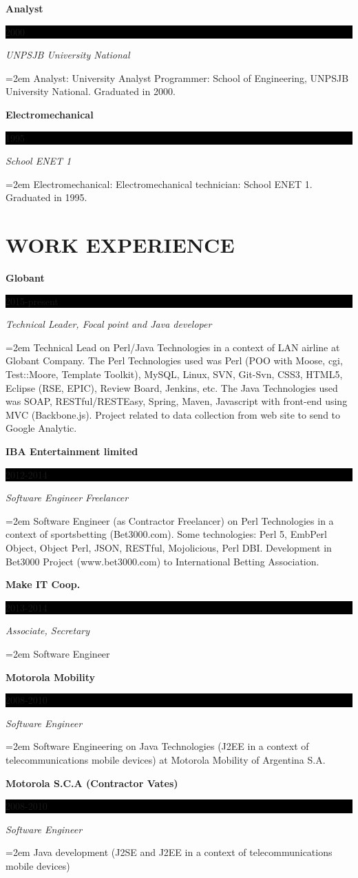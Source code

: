 \documentclass[paper=a4,fontsize=11pt]{scrartcl} %
\newcommand{\sepspace}{\vspace*{1em}}		%
\newcommand{\NewPart}[1]{\section*{\uppercase{#1}}}
\newcommand{\EducationEntry}[4]{
		\noindent \textbf{#1} \hfill      %
		\colorbox{Black}{%
			\parbox{6em}{%
			\hfill\color{White}#2}} \par  %
		\noindent \textit{#3} \par        %
		\noindent\hangindent=2em\hangafter=0 \small #4 %
		\normalsize \par}
\begin{document}
\EducationEntry{Analyst}{2000}{UNPSJB University National}{Analyst: University Analyst Programmer: School of Engineering, UNPSJB University National. Graduated in 2000.}
\sepspace

\EducationEntry{Electromechanical}{1995}{School ENET 1}{Electromechanical: Electromechanical technician: School ENET 1. Graduated in 1995.}
\sepspace

\NewPart{Work experience}{}

\EducationEntry{Globant}{2015-present}{Technical Leader, Focal point and Java developer}
{Technical Lead on Perl/Java Technologies in a context of LAN airline at Globant Company. The Perl Technologies used was Perl (POO with Moose, cgi, Test::Moore, Template Toolkit), MySQL, Linux, SVN, Git-Svn, CSS3, HTML5, Eclipse (RSE, EPIC), Review Board, Jenkins, etc. The Java Technologies used was SOAP, RESTful/RESTEasy, Spring, Maven, Javascript with front-end using MVC (Backbone.js). Project related to data collection from web site to send to Google Analytic.}
\sepspace

\EducationEntry{IBA Entertainment limited}{2012-2014}{Software Engineer Freelancer}
{Software Engineer (as Contractor Freelancer) on Perl Technologies in a context of sportsbetting (Bet3000.com). Some technologies: Perl 5, EmbPerl Object, Object Perl, JSON, RESTful, Mojolicious, Perl DBI. Development in Bet3000 Project (www.bet3000.com) to International Betting Association.}
\sepspace

\EducationEntry{Make IT Coop.}{2013-2014}{Associate, Secretary}{
Software Engineer}
\sepspace

\EducationEntry{Motorola Mobility}{2008-2010}{Software Engineer}
{Software Engineering on Java Technologies (J2EE in a context of telecommunications mobile devices) at Motorola Mobility of Argentina S.A.}
\sepspace

\EducationEntry{Motorola S.C.A (Contractor Vates)}{2008-2010}{Software Engineer}
{Java development (J2SE and J2EE in a context of telecommunications mobile devices)}
\sepspace
\end{document}
